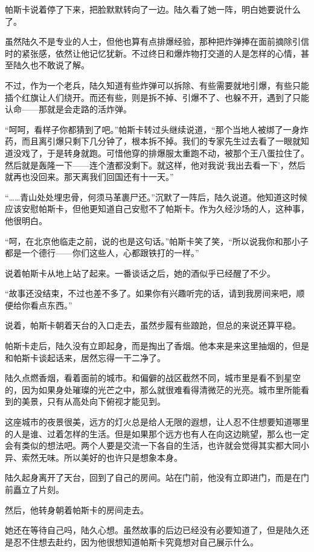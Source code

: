 帕斯卡说着停了下来，把脸默默转向了一边。陆久看了她一阵，明白她要说什么了。

虽然陆久不是专业的人士，但他也算有点排爆经验，那种把炸弹捧在面前摘除引信时的紧张感，依然让他记忆犹新。不过终日和爆炸物打交道的人是怎样的心情，甚至陆久也不敢说了解。

不过，作为一个老兵，陆久知道有些炸弹可以拆除、有些需要就地引爆，有些只能插个红旗让人们绕开。而还有些，则是拆不掉、引爆不了、也躲不开，遇到了只能认命——那就是会走路的活炸弹。

“呵呵，看样子你都猜到了吧。”帕斯卡转过头继续说道，“那个当地人被绑了一身炸药，而且离引爆只剩下几分钟了，根本拆不掉。我们的专家先生过去看了一眼就知道没戏了，于是转身就跑。可惜他穿的排爆服太重跑不动，被那个王八蛋拉住了。然后就是轰隆一下——连个渣都没剩下。就这样，他对我说‘我出去看一下’，然后就再也没回来。那天离我们回国还有十一天。”

“……青山处处埋忠骨，何须马革裹尸还。”沉默了一阵后，陆久说道。他知道这时候应该安慰帕斯卡，但他更知道自己安慰不了帕斯卡。作为久经沙场的人，这种事，他很明白。

“呵，在北京他临走之前，说的也是这句话。”帕斯卡笑了笑，“所以说我你和那小子都是一个德行——你们这些人，心都跟铁打的一样。”

说着帕斯卡从地上站了起来。一番谈话之后，她的酒似乎已经醒了不少。

“故事还没结束，不过也差不多了。如果你有兴趣听完的话，请到我房间来吧，顺便给你看点东西。”

说着，帕斯卡朝着天台的入口走去，虽然步履有些踉跄，但总的来说还算平稳。

帕斯卡走后，陆久没有立即起身，而是掏出了香烟。他本来是来这里抽烟的，但是和帕斯卡谈起话来，居然忘得一干二净了。

陆久点燃香烟，看着面前的城市。和偏僻的战区截然不同，城市里是看不到星空的，因为如果身处璀璨的光芒之中，那么就很难看得清微茫的光亮。城市里所能看到的美景，只有从高处向下俯视才能见到。

这座城市的夜景很美，远方的灯火总是给人无限的遐想，让人忍不住想要知道哪里的人是谁、过着怎样的生活。但是如果那个远方也有人在向这边眺望，那么也一定会有类似的想法吧。两个人要是交流一下各自的生活，也许就会觉得其实都大同小异、索然无味。所以美好的也许只是想象本身。

陆久起身离开了天台，回到了自己的房间。站在门前，他没有立即进门，而是在门前矗立了片刻。

然后，他转身朝着帕斯卡的房间走去。

她还在等待自己吗，陆久心想。虽然故事的后边已经没有必要知道了，但是陆久还是忍不住想去赴约，因为他很想知道帕斯卡究竟想对自己展示什么。

